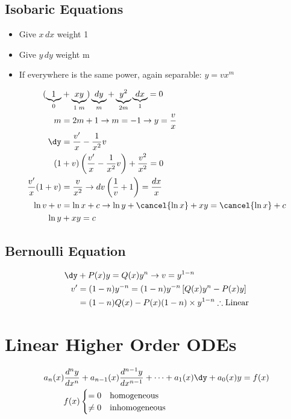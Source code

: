 \documentclass[Maths.tex]{subfiles}
\begin{document}
\subsection{Isobaric Equations}
\begin{itemize}
    \item Give $x\,dx$ weight 1
    \item Give $y\,dy$ weight m
    \item If everywhere is the same power, again separable: $y = vx^m$
\end{itemize}

\begin{align}
    (\underbrace{1}_{0} &+ \underbrace{xy}_{1\;m})\underbrace{dy}_{m} + \underbrace{y^2}_{2m}\underbrace{dx}_{1} = 0 \\
    m &= 2m + 1 \to m = -1 \to y = \frac{v}{x} \\
    \dy &= \frac{v'}{x} - \frac{1}{x^2}v \\
    (1 &+ v)\left(\frac{v'}{x} - \frac{1}{x^2}v\right) + \frac{v^2}{x^2} = 0 \\
    \frac{v'}{x}(1 + v) &= \frac{v}{x^2} \to dv\left(\frac{1}{v} + 1\right) = \frac{dx}{x} \\
    \ln{v} + v &= \ln{x} + c \to \ln{y} + \cancel{\ln{x}} + xy = \cancel{\ln{x}} + c \\
    \ln{y} &+ xy = c
\end{align}

\subsection{Bernoulli Equation}
\begin{align}
    \dy &+ P(x)y = Q(x)y^n \to v = y^{1 - n} \\
    v' &= (1 - n)y^{-n} = (1 - n)y^{-n}\left[Q(x)y^n - P(x)y\right] \\
    &= (1-n)Q(x) - P(x)(1 - n) \times y^{1-n} \therefore \text{Linear}
\end{align}

\section{Linear Higher Order ODEs}
\begin{align}
    a_n(x)\frac{d^ny}{dx^n} &+ a_{n - 1}(x)\frac{d^{n-1}y}{dx^{n-1}} + \cdots + a_1(x)\dy + a_0(x)y = f(x) \\
    f(x) & \begin{cases} = 0 & \text{homogeneous} \\ \neq 0 & \text{inhomogeneous} \end{cases}
\end{align}
\end{document}
